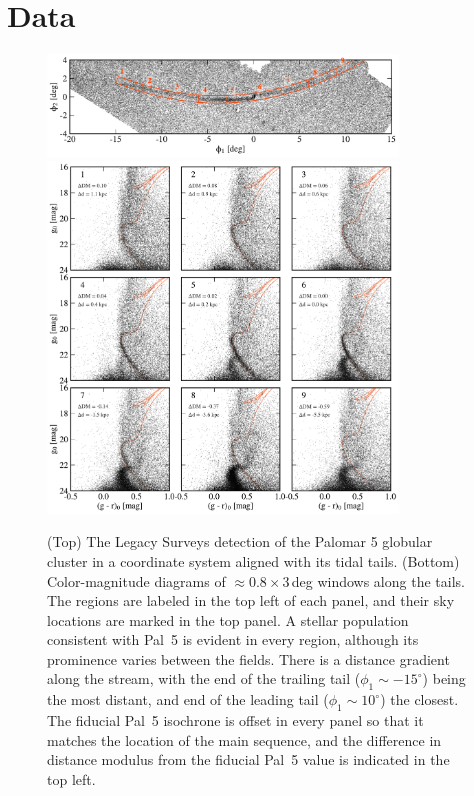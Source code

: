 \documentclass[twocolumn]{aastex62}
\newcommand{\sa}[1]{{\color{magenta} SP: #1}}
\begin{document}
\section{Data}
\label{sec:data}

\begin{figure}
\begin{center}
\includegraphics[width=0.83\textwidth]{fig1_a_map.pdf}
\includegraphics[width=0.83\textwidth]{fig1_b_cmds.pdf}
\end{center}
\caption{
(Top) The Legacy Surveys detection of the Palomar 5 globular cluster in a coordinate system aligned with its tidal tails.
(Bottom) Color-magnitude diagrams of $\approx0.8\times3$\,deg windows along the tails.
The regions are labeled in the top left of each panel, and their sky locations are marked in the top panel.
A stellar population consistent with Pal~5 is evident in every region, although its prominence varies between the fields.
There is a distance gradient along the stream, with the end of the trailing tail ($\phi_1\sim-15^\circ$) being the most distant, and end of the leading tail ($\phi_1\sim10^\circ$) the closest.
The fiducial Pal~5 isochrone is offset in every panel so that it matches the location of the main sequence, and the difference in distance modulus from the fiducial Pal~5 value is indicated in the top left.
}
\label{fig:cmds}
\end{figure}
\end{document}

